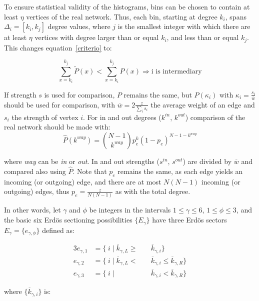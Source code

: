 \documentclass[%
 aip,
 jmp,%
 amsmath,amssymb,
 reprint,%
]{revtex4-1}
\begin{document}
To ensure statistical validity of the histograms, bins can be chosen to contain at least $\eta$ vertices of the real network. Thus, each bin, starting at degree $k_i$, spans $\Delta_i=[k_{i},k_{j}]$ degree values, where $j$ is the smallest integer with which there are at least $\eta$ vertices with degree larger than or equal $k_i$, and less than or equal $k_{j}$. This changes equation~\ref{criterio} to:

\begin{equation}\label{criterio2}
    \sum_{x=k_i}^{k_j} \widetilde{P}(x) < \sum_{x=k_i}^{k_j} P(x) \Rightarrow \text{i is intermediary}
\end{equation}

If strength $s$ is used for comparison, $P$ remains the same, but $P(\kappa_i)$ with $\kappa_i=\frac{s_i}{\overline{w}}$ should be used for comparison, with $\overline{w}=2\frac{z}{\sum_is_i}$ the average weight of an edge and $s_i$ the strength of vertex $i$. For in and out degrees ($k^{in}$, $k^{out}$) comparison of the real network should be made with:
\begin{equation}
\hat{P}(k^{way})=\binom{N-1}{k^{way}}p_e^k(1-p_e)^{N-1-k^{way}}
\end{equation}

\noindent where \emph{way} can be \emph{in} or \emph{out}. In and out strengths ($s^{in}$, $s^{out}$) are divided by $\overline{w}$ and compared also using $\hat{P}$. Note that $p_e$ remains the same, as each edge yields an incoming (or outgoing) edge, and there are at most $N(N-1)$ incoming (or outgoing) edges, thus $p_e=\frac{z}{N(N-1)}$ as with the total degree.

In other words, let $\gamma$ and $\phi$ be integers in the intervals $1 \leq \gamma \leq 6$, $1 \leq \phi \leq 3$, and the basic six Erd\"os sectioning possibilities $\{E_{\gamma}\}$ have three Erd\"os sectors $E_{\gamma}= \{e_{\gamma, \phi} \}$ defined as:

\begin{alignat}{3}\label{eq:part}
e_{\gamma,1}&=\{\;i\;|\;\overline{k}_{\gamma,L}\geq&&\overline{k}_{\gamma,i}\} \nonumber \\
e_{\gamma,2}&=\{\;i\;|\;\overline{k}_{\gamma,L}<\;&&\overline{k}_{\gamma,i}\leq\overline{k}_{\gamma,R}\} \\ 
e_{\gamma,3}&=\{\;i\;|\;&&\overline{k}_{\gamma,i}<\overline{k}_{\gamma,R}\} \nonumber
\end{alignat}

\noindent where $\{\overline{k}_{\gamma,i}\}$ is:
\end{document}
